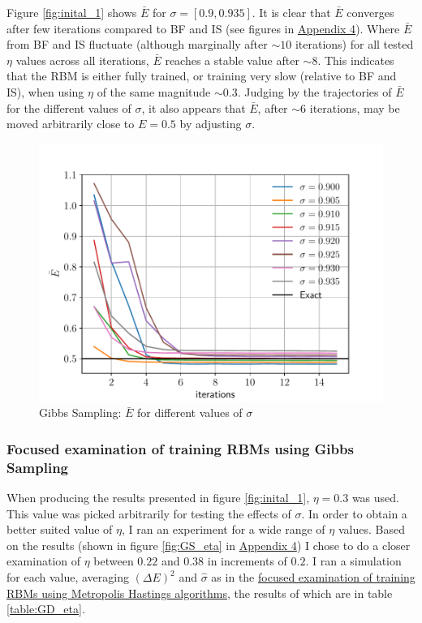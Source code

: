 \documentclass[%
oneside,                 %
final,                   %
10pt]{article}
\begin{document}
Figure \ref{fig:inital_1} shows $\bar E$ for $\sigma=[0.9,0.935]$. It is clear that $\bar E$ converges after few iterations compared to BF and IS (see figures in \hyperref[APP_4]{Appendix 4}). Where $\bar E$ from BF and IS fluctuate (although marginally after $\sim 10$ iterations) for all tested $\eta$ values across all iterations, $\bar E$ reaches a stable value after $\sim 8$. This indicates that the RBM is either fully trained, or training very slow (relative to BF and IS), when using $\eta$ of the same magnitude $\sim 0.3$. Judging by the trajectories of $\bar E$ for the different values of $\sigma$, it also appears that $\bar E$, after $\sim 6$  iterations, may be moved arbitrarily close to $E=0.5$ by adjusting $\sigma$. 
\begin{figure}[H]
        \centering 
         \includegraphics[scale=0.7]{../Results/sim_8/GS_sigma.pdf} 
        \caption{Gibbs Sampling:  $\bar E$ for different values of $\sigma$ }
        \label{fig:GS_sigma}   
\end{figure}  


\subsubsection{Focused examination of training RBMs using Gibbs Sampling} \label{Results_focused_GS}
When producing the results presented in figure \ref{fig:inital_1}, $\eta = 0.3$ was used. This value was picked arbitrarily for testing the effects of $\sigma$. In order to obtain a better suited value of $\eta$, I ran an experiment for a wide range of $\eta$ values. Based on the results (shown in figure \ref{fig:GS_eta} in \hyperref[APP_4]{Appendix 4}) I chose to do a closer examination of $\eta$ between $0.22$ and $0.38$ in increments of $0.2$. I ran a simulation for each value, averaging $(\Delta E)^2$ and $\hat \sigma$ as in the \hyperref[Results_focused_MH]{focused examination of training RBMs using Metropolis Hastings algorithms}, the results of which are in table \ref{table:GD_eta}. 
\end{document}
